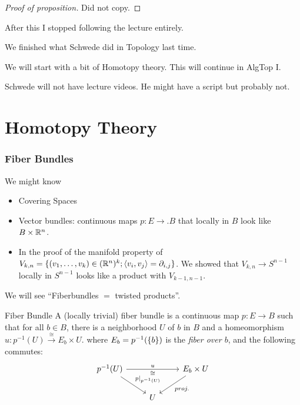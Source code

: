 \documentclass[language=english]{TemplateLecture}
\begin{document}
\begin{proof}[Proof of proposition]
    Did not copy.
\end{proof}

After this I stopped following the lecture entirely.


We finished what Schwede did in Topology last time.

We will start with a bit of Homotopy theory. This will continue in AlgTop I.

Schwede will not have lecture videos. He might have a script but probably not.

\part{Homotopy Theory}

\section{Fiber Bundles}

We might know
\begin{itemize}
    \item Covering Spaces
    \item Vector bundles: continuous maps \(p \colon E \to. B\) that locally in \(B\) look like \(B \times \mathbb{R}^n\).
    \item In the proof of the manifold property of \(V_{k,n} = \{(v_1, \dots, v_k) \in (\mathbb{R}^n)^k; \langle v_i, v_j\rangle = \partial_{i,j}\}\). We showed that \(V_{k,n} \to S^{n-1}\) locally in \(S^{n-1}\) looks like a product with \(V_{k-1, n-1}\).
\end{itemize}

We will see \enquote{Fiberbundles \(=\) twisted products}.

\begin{defi}{Fiber Bundle}{}
    A (locally trivial) fiber bundle is a continuous map \(p \colon E \to B\) such that for all \(b \in B\), there is a neighborhood \(U\) of \(b\) in \(B\) and a homeomorphism \(u\colon p^{-1}(U) \xrightarrow{\cong} E_b \times U\). where \(E_b = p^{-1}(\{b\})\) is the \emph{fiber over \(b\)}, and the following commutes:
    \[\begin{tikzcd}
        p^{-1}(U) \ar[rd, "p\rvert_{p^{-1}(U)}"] \ar[rr, "u", "\cong"'] & & E_b \times U \ar[dl, "proj."] \\
        & U & 
    \end{tikzcd}\]
\end{defi}
\end{document}
